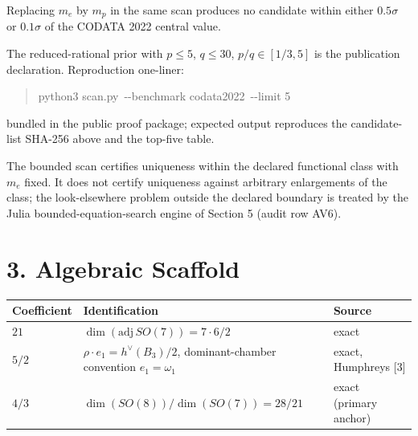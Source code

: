\documentclass[
  11pt,
  letterpaper,
  twocolumn,
]{article}
\begin{document}
Replacing \(m_e\) by \(m_p\) in the same scan produces no candidate
within either \(0.5\sigma\) or \(0.1\sigma\) of the CODATA 2022 central
value.

The reduced-rational prior with \(p\!\le\!5\), \(q\!\le\!30\),
\(p/q\!\in\![1/3,5]\) is the publication declaration. Reproduction
one-liner:

\begin{quote}
\small\ttfamily python3 scan.py\allowbreak\ -{}-benchmark codata2022\allowbreak\ -{}-limit 5
\end{quote}

bundled in the public proof package; expected output reproduces the
candidate-list SHA-256 above and the top-five table.

The bounded scan certifies uniqueness within the declared functional
class with \(m_e\) fixed. It does not certify uniqueness against
arbitrary enlargements of the class; the look-elsewhere problem outside
the declared boundary is treated by the Julia bounded-equation-search
engine of Section 5 (audit row AV6).

\section{3. Algebraic Scaffold}\label{algebraic-scaffold}

\begin{table}[!htb]
\centering\small
\begin{tabular}{@{}
  >{\raggedright\arraybackslash}p{}
  >{\raggedright\arraybackslash}p{}
  >{\raggedright\arraybackslash}p{}@{}}
\toprule
\begin{minipage}[b]{\linewidth}\raggedright
Coefficient
\end{minipage} & \begin{minipage}[b]{\linewidth}\raggedright
Identification
\end{minipage} & \begin{minipage}[b]{\linewidth}\raggedright
Source
\end{minipage} \\
\midrule
\(21\) & \(\dim(\mathrm{adj}\,SO(7)) = 7\!\cdot\!6/2\) & exact \\
\(5/2\) & \(\rho \cdot e_1 = h^\vee(B_3)/2\), dominant-chamber
convention \(e_1=\omega_1\) & exact, Humphreys {[}3{]} \\
\(4/3\) & \(\dim(SO(8))/\dim(SO(7)) = 28/21\) & exact (primary
anchor) \\
\bottomrule
\end{tabular}
\end{table}
\end{document}
